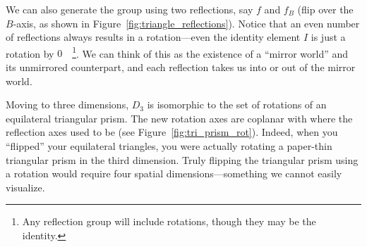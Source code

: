\documentclass[../gatm.tex]{subfiles}
\begin{document}
We can also generate the group using two reflections, say $f$ and $f_B$ (flip over the $B$-axis, as shown in Figure~\ref{fig:triangle_reflections}). Notice that an even number of reflections always results in a rotation---even the identity element $I$ is just a rotation by $0\quad$\footnote{Any reflection group will include rotations, though they may be the identity.}. We can think of this as the existence of a ``mirror world'' and its unmirrored counterpart, and each reflection takes us into or out of the mirror world.

\noindent Moving to three dimensions, $D_3$ is isomorphic to the set of rotations of an equilateral triangular prism. The new rotation axes are coplanar with where the reflection axes used to be (see Figure~\ref{fig:tri_prism_rot}). Indeed, when you ``flipped'' your equilateral triangles, you were actually rotating a paper-thin triangular prism in the third dimension. Truly flipping the triangular prism using a rotation would require four spatial dimensions---something we cannot easily visualize.
\end{document}
